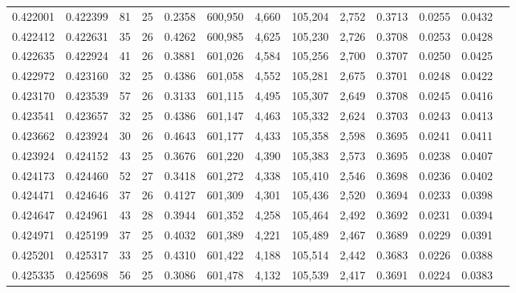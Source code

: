 \begin{tabular}{rrrrrrrrrrrrr}
0.422001 & 0.422399 &    81 &  25 &                                     0.2358 & 600,950 &   4,660 & 105,204 &   2,752 & 0.3713 & 0.0255 & 0.0432 \\
0.422412 & 0.422631 &    35 &  26 &                                     0.4262 & 600,985 &   4,625 & 105,230 &   2,726 & 0.3708 & 0.0253 & 0.0428 \\
0.422635 & 0.422924 &    41 &  26 &                                     0.3881 & 601,026 &   4,584 & 105,256 &   2,700 & 0.3707 & 0.0250 & 0.0425 \\
0.422972 & 0.423160 &    32 &  25 &                                     0.4386 & 601,058 &   4,552 & 105,281 &   2,675 & 0.3701 & 0.0248 & 0.0422 \\
0.423170 & 0.423539 &    57 &  26 &                                     0.3133 & 601,115 &   4,495 & 105,307 &   2,649 & 0.3708 & 0.0245 & 0.0416 \\
0.423541 & 0.423657 &    32 &  25 &                                     0.4386 & 601,147 &   4,463 & 105,332 &   2,624 & 0.3703 & 0.0243 & 0.0413 \\
0.423662 & 0.423924 &    30 &  26 &                                     0.4643 & 601,177 &   4,433 & 105,358 &   2,598 & 0.3695 & 0.0241 & 0.0411 \\
0.423924 & 0.424152 &    43 &  25 &                                     0.3676 & 601,220 &   4,390 & 105,383 &   2,573 & 0.3695 & 0.0238 & 0.0407 \\
0.424173 & 0.424460 &    52 &  27 &                                     0.3418 & 601,272 &   4,338 & 105,410 &   2,546 & 0.3698 & 0.0236 & 0.0402 \\
0.424471 & 0.424646 &    37 &  26 &                                     0.4127 & 601,309 &   4,301 & 105,436 &   2,520 & 0.3694 & 0.0233 & 0.0398 \\
0.424647 & 0.424961 &    43 &  28 &                                     0.3944 & 601,352 &   4,258 & 105,464 &   2,492 & 0.3692 & 0.0231 & 0.0394 \\
0.424971 & 0.425199 &    37 &  25 &                                     0.4032 & 601,389 &   4,221 & 105,489 &   2,467 & 0.3689 & 0.0229 & 0.0391 \\
0.425201 & 0.425317 &    33 &  25 &                                     0.4310 & 601,422 &   4,188 & 105,514 &   2,442 & 0.3683 & 0.0226 & 0.0388 \\
0.425335 & 0.425698 &    56 &  25 &                                     0.3086 & 601,478 &   4,132 & 105,539 &   2,417 & 0.3691 & 0.0224 & 0.0383 \\

\end{tabular}
